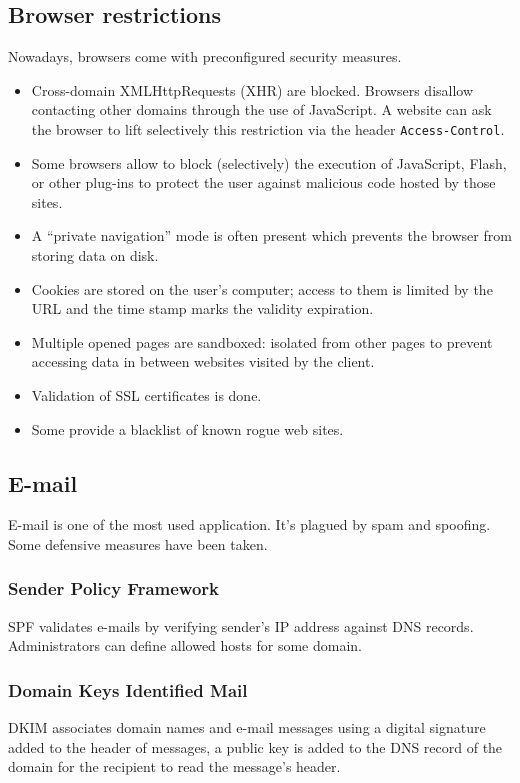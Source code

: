\subsection{Browser restrictions}

Nowadays, browsers come with preconfigured security measures.

\begin{itemize}
\item Cross-domain XMLHttpRequests (XHR) are blocked.
	Browsers disallow contacting other domains through the use of JavaScript.
	A website can ask the browser to lift selectively this restriction via the
	header \texttt{Access-Control}.
\item Some browsers allow to block (selectively) the execution of JavaScript,
	Flash, or other plug-ins to protect the user against malicious code hosted
	by those sites.
\item A ``private navigation'' mode is often present which prevents the browser
	from storing data on disk.
\item Cookies are stored on the user's computer; access to them is limited by
	the URL and the time stamp marks the validity expiration.
\item Multiple opened pages are sandboxed: isolated from other pages to
	prevent accessing data in between websites visited by the client.
\item Validation of SSL certificates is done.
\item Some provide a blacklist of known rogue web sites.
\end{itemize}

\subsection{E-mail}

E-mail is one of the most used application. It's plagued by spam and
spoofing. Some defensive measures have been taken.

\subsubsection{Sender Policy Framework}
SPF validates e-mails by verifying sender's IP address against DNS records.
Administrators can define allowed hosts for some domain.

\subsubsection{Domain Keys Identified Mail}
DKIM associates domain names and e-mail messages using a digital signature
added to the header of messages, a public key is added to the DNS record of
the domain for the recipient to read the message's header.

